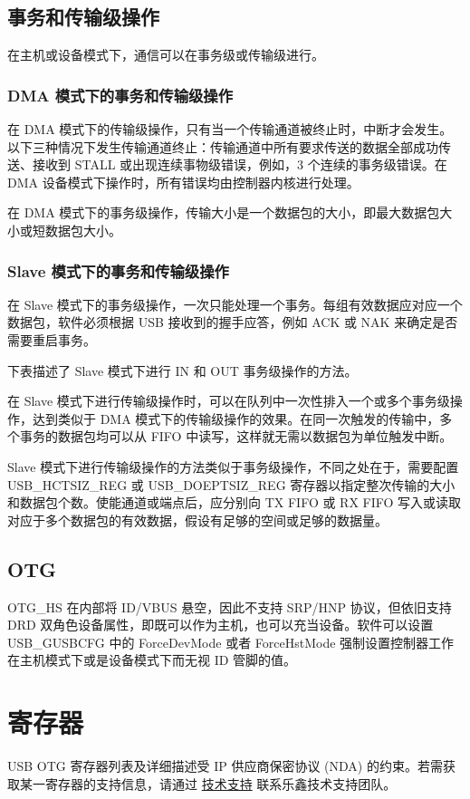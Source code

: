 \documentclass[main\_\_CN.tex]{subfiles}
\begin{document}
\subsection{事务和传输级操作}

在主机或设备模式下，通信可以在事务级或传输级进行。

\subsubsection{DMA 模式下的事务和传输级操作}

在 DMA 模式下的传输级操作，只有当一个传输通道被终止时，中断才会发生。以下三种情况下发生传输通道终止：传输通道中所有要求传送的数据全部成功传送、接收到 STALL 或出现连续事物级错误，例如，3 个连续的事务级错误。在 DMA 设备模式下操作时，所有错误均由控制器内核进行处理。

在 DMA 模式下的事务级操作，传输大小是一个数据包的大小，即最大数据包大小或短数据包大小。

\subsubsection{Slave 模式下的事务和传输级操作}

在 Slave 模式下的事务级操作，一次只能处理一个事务。每组有效数据应对应一个数据包，软件必须根据 USB 接收到的握手应答，例如 ACK 或 NAK 来确定是否需要重启事务。

下表描述了 Slave 模式下进行 IN 和 OUT 事务级操作的方法。



在 Slave 模式下进行传输级操作时，可以在队列中一次性排入一个或多个事务级操作，达到类似于 DMA 模式下的传输级操作的效果。在同一次触发的传输中，多个事务的数据包均可以从 FIFO 中读写，这样就无需以数据包为单位触发中断。

Slave 模式下进行传输级操作的方法类似于事务级操作，不同之处在于，需要配置 USB\_HCTSIZ\_REG 或 USB\_DOEPTSIZ\_REG 寄存器以指定整次传输的大小和数据包个数。使能通道或端点后，应分别向 TX FIFO 或 RX FIFO 写入或读取对应于多个数据包的有效数据，假设有足够的空间或足够的数据量。

\subsection{OTG}

OTG\_HS 在内部将 ID/VBUS 悬空，因此不支持 SRP/HNP 协议，但依旧支持 DRD 双角色设备属性，即既可以作为主机，也可以充当设备。软件可以设置 USB\_GUSBCFG 中的 ForceDevMode 或者 ForceHstMode 强制设置控制器工作在主机模式下或是设备模式下而无视 ID 管脚的值。

\section{寄存器}

USB OTG 寄存器列表及详细描述受 IP 供应商保密协议 (NDA) 的约束。若需获取某一寄存器的支持信息，请通过 \href{https://www.espressif.com/zh-hans/contact-us/technical-inquiries}{技术支持} 联系乐鑫技术支持团队。
\end{document}
